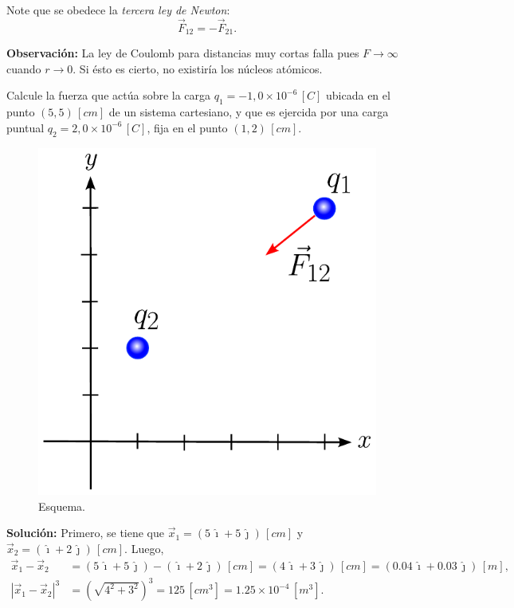 Note que se obedece la \textit{tercera ley de Newton}:
\begin{equation*}
\vec{F}_{12} = - \vec{F}_{21}. 
\end{equation*}

\textbf{Observación:} La ley de Coulomb para distancias muy cortas falla pues $F \to \infty$ cuando $r \to 0$. Si ésto es cierto, no existiría los núcleos atómicos.

\begin{ejemplo}
Calcule la fuerza que actúa sobre la carga $q_1 = -1,0 \times 10^{-6} \,[C]$ ubicada en el punto $(5,5) \,[cm]$ de un sistema cartesiano, y que es ejercida por una carga puntual $q_2 = 2,0 \times 10^{-6} \, [C]$, fija en el punto $(1,2) \,[cm]$. 


\begin{figure}[H]
    \centering
    \includegraphics[scale = 0.5]{Figuras/Ej-Coulomb.pdf}
    \caption{Esquema.}
    \label{fig:Ej-Coulomb}
\end{figure}

\textbf{Solución:} Primero, se tiene que $\vec{x}_1 = (5 \,\hat{\imath} + 5 \, \hat{\jmath}) \,[cm]$ y $\vec{x}_2= (  \hat{\imath} + 2 \,\hat{\jmath}) \,[cm]$. Luego,
\begin{align*}
 \vec{x}_1 - \vec{x}_2 &= (5 \,\hat{\imath} + 5 \,\hat{\jmath}) - (\hat{\imath} + 2 \, \hat{\jmath}) \,[cm] = (4 \,\hat{\imath} + 3\,\hat{\jmath}) \,[cm] = (0.04 \,\hat{\imath} + 0.03\,\hat{\jmath}) \,[m], \\
|\vec{x}_1 - \vec{x}_2|^3 &= \left( \sqrt{4^2 + 3^2} \right)^3 = 125 \,[cm^3] = 1.25 \times 10^{-4} \, [m^3].   
\end{align*}


\end{ejemplo}
